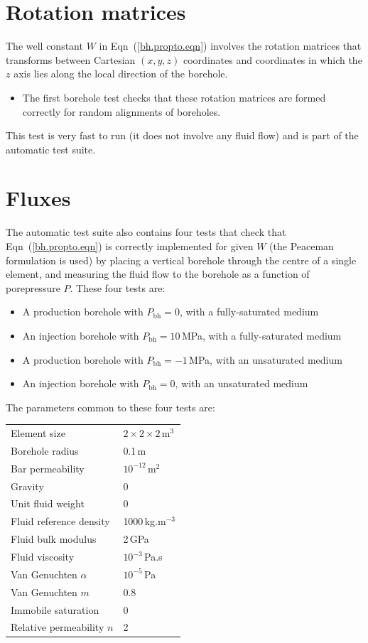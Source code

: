 \documentclass[]{scrreprt}
\begin{document}
\section{Rotation matrices}
The well constant $W$ in Eqn~(\ref{bh.propto.eqn})
involves the rotation matrices that transforms between Cartesian
$(x,y,z)$ coordinates and coordinates in which the $z$ axis lies along
the local direction of the borehole.
\begin{itemize}
\item The first borehole test checks that these rotation matrices are
  formed correctly for random alignments of boreholes.
\end{itemize}
This test is very fast to run (it does not involve any fluid flow) and
is part of the automatic test suite.

\section{Fluxes}
The automatic test suite also contains four tests that check that
Eqn~(\ref{bh.propto.eqn}) is correctly implemented for given $W$ (the
Peaceman formulation is used) by placing a vertical borehole through
the centre of a single element, and measuring the fluid flow to the
borehole as a function of porepressure $P$.  These four tests are:
\begin{itemize}
\item A production borehole with $P_{\mathrm{bh}} = 0$, with a
  fully-saturated medium
\item An injection borehole with $P_{\mathrm{bh}} = 10$\,MPa, with a
  fully-saturated medium
\item A production borehole with $P_{\mathrm{bh}} = -1$\,MPa, with an
  unsaturated medium
\item An injection borehole with $P_{\mathrm{bh}} = 0$, with an
  unsaturated medium
\end{itemize}
The parameters common to these four tests are:
\begin{center}
\begin{tabular}{|ll|}
\hline
Element size & $2\times 2\times 2$\,m$^{3}$ \\
Borehole radius & 0.1\,m \\
Bar permeability & $10^{-12}$\,m$^{2}$ \\
Gravity & 0 \\
Unit fluid weight & 0 \\
Fluid reference density & 1000\,kg.m$^{-3}$ \\
Fluid bulk modulus & 2\,GPa \\
Fluid viscosity & $10^{-3}$\,Pa.s \\
Van Genuchten $\alpha$ & $10^{-5}$\,Pa \\
Van Genuchten $m$ & 0.8  \\
Immobile saturation & 0 \\
Relative permeability $n$ & 2 \\
\hline
\end{tabular} \\
\end{center}
\end{document}
